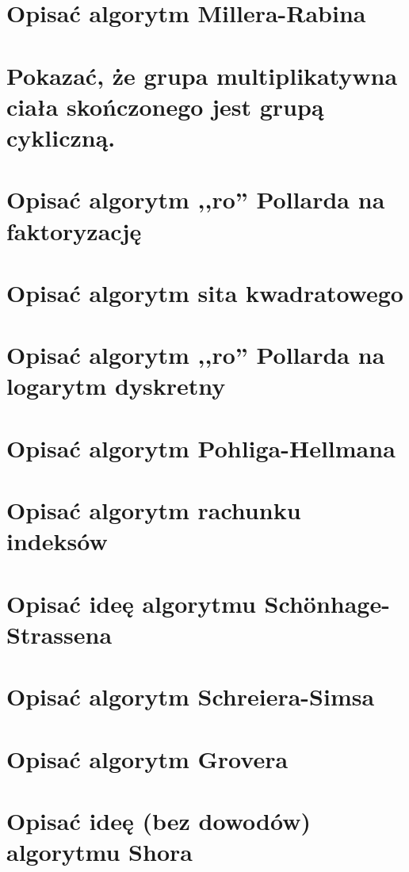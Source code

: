 \section{Opisać algorytm Millera-Rabina}


\section{Pokazać, że grupa multiplikatywna ciała skończonego jest grupą cykliczną.}


\section{Opisać algorytm ,,ro'' Pollarda na faktoryzację}
\label{C:question03}


\section{Opisać algorytm sita kwadratowego}


\section{Opisać algorytm ,,ro'' Pollarda na logarytm dyskretny}



\section{Opisać algorytm Pohliga-Hellmana}


\section{Opisać algorytm rachunku indeksów}


\section{Opisać ideę algorytmu Sch{\"o}nhage-Strassena}


\section{Opisać algorytm Schreiera-Simsa}


\section{Opisać algorytm Grovera}


\section{Opisać ideę (bez dowodów) algorytmu Shora}
